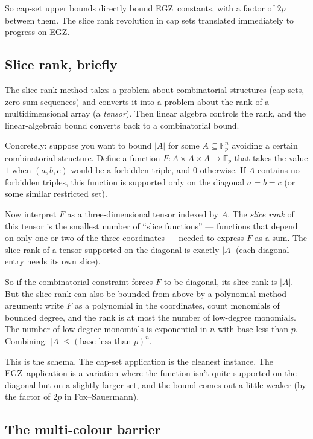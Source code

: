 \documentclass[11pt,a4paper]{article}
\theoremstyle{plain}
\theoremstyle{definition}
\theoremstyle{remark}
\newcommand{\F}{\mathbb{F}}
\newcommand{\EGZ}{\textsf{EGZ}}
\begin{document}
So cap-set upper bounds directly bound \EGZ\ constants, with a factor of $2p$ between them. The slice rank revolution in cap sets translated immediately to progress on \EGZ.

\subsection{Slice rank, briefly}

The slice rank method takes a problem about combinatorial structures (cap sets, zero-sum sequences) and converts it into a problem about the rank of a multidimensional array (a \emph{tensor}). Then linear algebra controls the rank, and the linear-algebraic bound converts back to a combinatorial bound.

Concretely: suppose you want to bound $|A|$ for some $A \subseteq \F_p^n$ avoiding a certain combinatorial structure. Define a function $F: A \times A \times A \to \F_p$ that takes the value $1$ when $(a, b, c)$ would be a forbidden triple, and $0$ otherwise. If $A$ contains no forbidden triples, this function is supported only on the diagonal $a = b = c$ (or some similar restricted set). 

Now interpret $F$ as a three-dimensional tensor indexed by $A$. The \emph{slice rank} of this tensor is the smallest number of ``slice functions'' --- functions that depend on only one or two of the three coordinates --- needed to express $F$ as a sum. The slice rank of a tensor supported on the diagonal is exactly $|A|$ (each diagonal entry needs its own slice).

So if the combinatorial constraint forces $F$ to be diagonal, its slice rank is $|A|$. But the slice rank can also be bounded from above by a polynomial-method argument: write $F$ as a polynomial in the coordinates, count monomials of bounded degree, and the rank is at most the number of low-degree monomials. The number of low-degree monomials is exponential in $n$ with base less than $p$. Combining: $|A| \leq (\text{base less than } p)^n$.

This is the schema. The cap-set application is the cleanest instance. The \EGZ\ application is a variation where the function isn't quite supported on the diagonal but on a slightly larger set, and the bound comes out a little weaker (by the factor of $2p$ in Fox--Sauermann).

\subsection{The multi-colour barrier}
\end{document}
